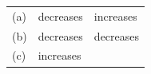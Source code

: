 \begin{enumerate}[noitemsep, label=\textbf{\arabic*}. ]
\begin{enumerate}[noitemsep, label=\textbf{\alph*}. ]
{\begin{center}
\begin{xtabular*}{\mytablewidth}[t]{|p{10\mystarwidth}|p{10\mystarwidth}|p{10\mystarwidth}|}
    
        (a) &
    
    
        decreases &
    
    
        increases%
     \tabularnewline{}
    
    
        (b) &
    
    
        decreases &
    
    
        decreases%
     \tabularnewline{}
    
    
        (c) &
    
    
        increases &
    
    

\end{xtabular*}
\end{center}}
\end{enumerate}
\end{enumerate}
